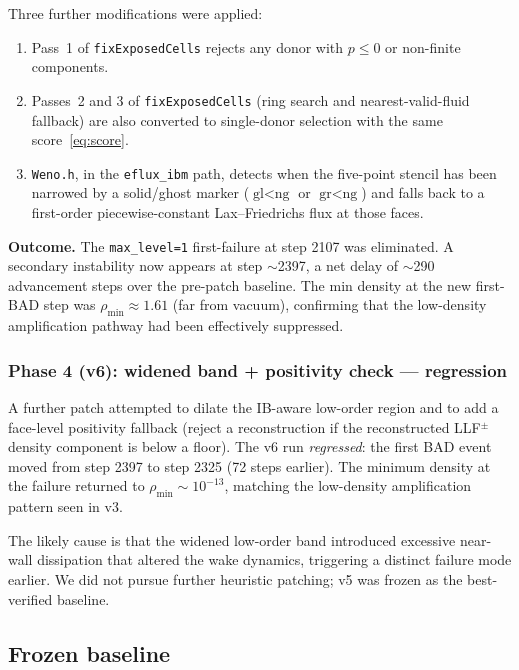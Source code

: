 Three further modifications were applied:
\begin{enumerate}
  \item Pass~1 of \texttt{fixExposedCells} rejects any donor with
        $p \le 0$ or non-finite components.
  \item Passes~2 and 3 of \texttt{fixExposedCells} (ring search and
        nearest-valid-fluid fallback) are also converted to single-donor
        selection with the same score~\eqref{eq:score}.
  \item \texttt{Weno.h}, in the \texttt{eflux\_ibm} path, detects when the
        five-point stencil has been narrowed by a solid/ghost marker
        ($\text{gl}<\text{ng}$ or $\text{gr}<\text{ng}$) and falls back to
        a first-order piecewise-constant Lax--Friedrichs flux at those
        faces.
\end{enumerate}

\textbf{Outcome.} The \texttt{max\_level=1} first-failure at step 2107 was
eliminated. A secondary instability now appears at step $\sim$2397, a net
delay of $\sim$290 advancement steps over the pre-patch baseline. The min
density at the new first-BAD step was $\rho_{\min}\approx 1.61$ (far from
vacuum), confirming that the low-density amplification pathway had been
effectively suppressed.

\subsubsection{Phase 4 (v6): widened band + positivity check --- regression}

A further patch attempted to dilate the IB-aware low-order region and to
add a face-level positivity fallback (reject a reconstruction if the
reconstructed LLF$^{\pm}$ density component is below a floor). The v6 run
\emph{regressed}: the first BAD event moved from step 2397 to step 2325
(72 steps earlier). The minimum density at the failure returned to
$\rho_{\min}\sim 10^{-13}$, matching the low-density amplification pattern
seen in v3.

The likely cause is that the widened low-order band introduced excessive
near-wall dissipation that altered the wake dynamics, triggering a
distinct failure mode earlier. We did not pursue further heuristic
patching; v5 was frozen as the best-verified baseline.

\subsection{Frozen baseline}

